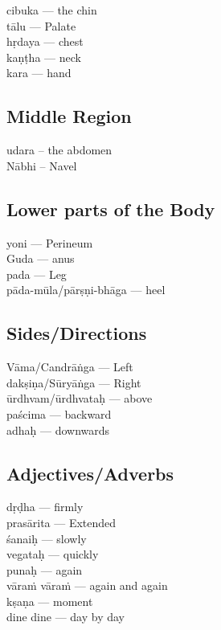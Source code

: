 
\begin{multicols}{2}
cibuka --- the chin \\
tālu --- Palate \\
hṛdaya --- chest\\ 
kaṇṭha --- neck\\
kara --- hand
\end{multicols}

\subsection*{Middle Region}

\begin{multicols}{2}
udara -- the abdomen \\
Nābhi -- Navel 
\end{multicols}

\subsection*{Lower parts of the Body}

\begin{multicols}{2}
yoni --- Perineum \\
Guda --- anus\\
pada --- Leg\\
pāda-mūla/pārṣṇi-bhāga --- heel
\end{multicols}
\newpage

\subsection*{Sides/Directions}

\begin{multicols}{2}
Vāma/Candrāṅga --- Left \\
dakṣiṇa/Sūryāṅga --- Right\\
ūrdhvam/ūrdhvataḥ --- above\\ 
paścima --- backward \\
adhaḥ --- downwards 
\end{multicols}

\subsection*{Adjectives/Adverbs}

\begin{multicols}{2}
dṛḍha --- firmly \\
prasārita --- Extended\\
śanaiḥ --- slowly \\
vegataḥ --- quickly\\ 
punaḥ --- again \\
vāraṁ vāraṁ --- again and again \\
kṣaṇa --- moment \\
dine dine --- day by day
\end{multicols}

